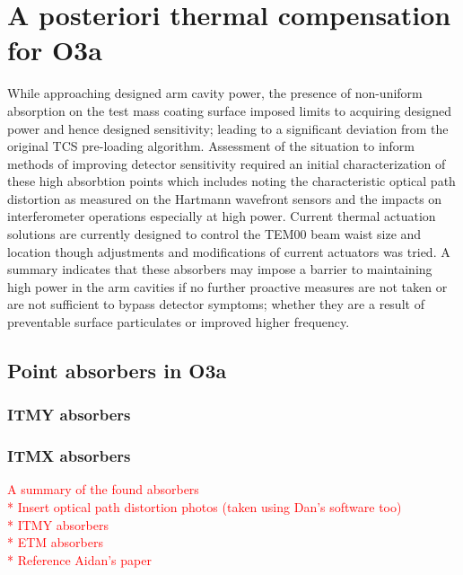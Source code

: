\section{A posteriori thermal compensation for O3a}
While approaching designed arm cavity power, the presence of non-uniform absorption on the test mass coating surface imposed limits to acquiring designed power and hence designed sensitivity; leading to a significant deviation from the original TCS pre-loading algorithm.  Assessment of the situation to inform methods of improving detector sensitivity required an initial characterization of these high absorbtion points which includes noting the characteristic optical path distortion as measured on the Hartmann wavefront sensors and the impacts on interferometer operations especially at high power. Current thermal actuation solutions are currently designed to control the TEM00 beam waist size and location though adjustments and modifications of current actuators was tried. A summary indicates that these absorbers may impose a barrier to maintaining high power in the arm cavities if no further proactive measures are not taken or are not sufficient to bypass detector symptoms; whether they are a result of preventable surface particulates or improved higher frequency.  


\subsection{Point absorbers in O3a}
\subsubsection{ITMY absorbers}


\subsubsection{ITMX absorbers}
\textcolor{red}{A summary of the found absorbers \\
	* Insert optical path distortion photos (taken using Dan's software too) \\
		* ITMY absorbers \\
		* ETM absorbers \\
	* Reference Aidan's paper} \\

